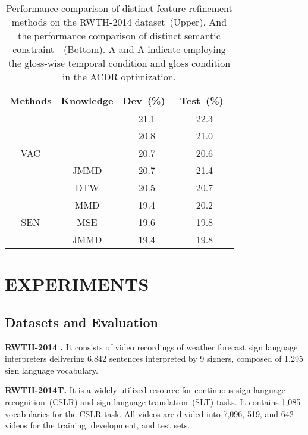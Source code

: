 \documentclass[sigconf]{acmart}
\begin{document}
\setlength{\tabcolsep}{9pt}
\begin{table}[!htbp]
\centering
\fontsize{9}{12}\selectfont
\caption{Performance comparison of distinct feature refinement methods on the {RWTH-2014} dataset~(Upper).
And the performance comparison of distinct semantic constraint~~(Bottom). {A} and {A} indicate employing the gloss-wise temporal condition and gloss condition in the ACDR optimization.}
\begin{tabular}{c|c|c|c} 
\toprule
Methods & Knowledge & Dev~(\%)~ & Test~(\%)~ \\ \midrule \multirow{5}{*}{VAC} & - & 21.1 & 22.3 \\ ~ &  & 20.8 & 21.0 \\\cmidrule{2-4} ~ &  & 20.7 & 20.6 \\ ~ & JMMD & 20.7 & 21.4 \\ ~ & DTW & 20.5 & 20.7 \\ \midrule \multirow{3}{*}{SEN} & MMD & 19.4 & 20.2 \\ ~ & MSE & 19.6 & 19.8 \\ ~ & JMMD & 19.4 & 19.8 \\ \bottomrule
    \end{tabular}
    \label{Table:abl_konwledge}
\end{table}











\section{EXPERIMENTS}
\subsection{Datasets and Evaluation}
\label{sec_Data_implement}
\noindent\textbf{RWTH-2014 \cite{koller2015continuous}.} It consists of video recordings of weather forecast sign language interpreters delivering 6,842 sentences interpreted by 9 signers, composed of 1,295 sign language vocabulary.


\noindent\textbf{RWTH-2014T\cite{camgoz2018neural}.} It is a widely utilized resource for continuous sign language recognition~(CSLR) and sign language translation~(SLT) tasks. It contains 1,085 vocabularies for the CSLR task. All videos are divided into 7,096, 519, and 642 videos for the training, development, and test sets.
\end{document}
